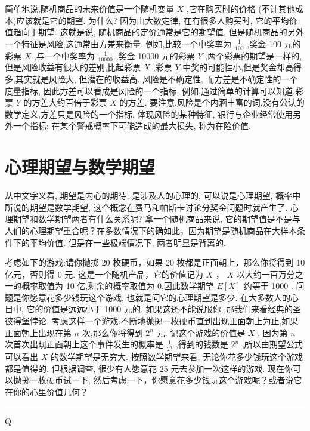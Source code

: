 \documentclass[10pt]{article}
\newcommand{\HRule}{\begin{center}\rule{0.9\linewidth}{0.2mm}\end{center}}
\begin{document}
简单地说,随机商品的未来价值是一个随机变量 \(X\) ,它在购买时的价格 (不计其他成本)应该就是它的期望. 为什么? 因为由大数定律, 在有很多人购买时, 它的平均价值趋向于期望. 这就是说, 随机商品的定价通常是它的期望值. 但是随机商品的另外一个特征是风险,这通常由方差来衡量. 例如,比较一个中奖率为 \(\frac{1}{100}\) ,奖金 100 元的彩票 \(X\) ,与一个中奖率为 \(\frac{1}{10000}\) ,奖金 10000 元的彩票 \(Y\) ,两个彩票的期望是一样的,但是风险收益有很大的差别,比起彩票 \(X\) ,彩票 \(Y\) 中奖的可能性小,但是奖金却高得多,其实就是风险大, 但潜在的收益高. 风险是不确定性, 而方差是不确定性的一个度量指标, 因此方差可以看成是风险的一个指标. 例如,通过简单的计算可以知道,彩票 \(Y\) 的方差大约百倍于彩票 \(X\) 的方差. 要注意,风险是个内涵丰富的词,没有公认的数学定义,方差只是风险的一个指标, 体现风险的某种特征, 银行与企业经常使用另外一个指标: 在某个警戒概率下可能造成的最大损失, 称为在险价值.



\section*{心理期望与数学期望}

从中文字义看, 期望是内心的期待, 是涉及人的心理的, 可以说是心理期望, 概率中所说的期望是数学期望, 这个概念在费马和帕斯卡讨论分奖金问题时就产生了. 心理期望和数学期望两者有什么关系呢? 拿一个随机商品来说, 它的期望值是不是与人们的心理期望重合呢？在多数情况下的确如此，因为期望是随机商品在大样本条件下的平均价值. 但是在一些极端情况下, 两者明显是背离的.

考虑如下的游戏:请你抛掷 20 枚硬币，如果 20 枚都是正面朝上，那么你将得到 10 亿元，否则得 0 元. 这是一个随机产品，它的价值记为 \(X\) ， \(X\) 以大约一百万分之一的概率取值为 10 亿,剩余的概率取值为 0,因此数学期望 \(E\left\lbrack  X\right\rbrack\) 约等于 1000 . 问题是你愿意花多少钱玩这个游戏, 也就是问它的心理期望是多少. 在大多数人的心目中, 它的价值是远远小于 1000 元的. 如果这还不能说服你, 那我们来看经典的圣彼得堡悖论. 考虑这样一个游戏:不断地抛掷一枚硬币直到出现正面朝上为止,如果正面朝上出现在第 \(n\) 次,那么你将得到 \({2}^{n}\) 元. 记这个游戏的价值是 \(X\) . 因为第 \(n\) 次首次出现正面朝上这个事件发生的概率是 \(\frac{1}{{2}^{n}}\) ,得到的钱数是 \({2}^{n}\) ,所以由期望公式可以看出 \(X\) 的数学期望是无穷大. 按照数学期望来看, 无论你花多少钱玩这个游戏都是值得的. 但根据调查, 很少有人愿意花 25 元去参加一次这样的游戏. 现在你可以抛掷一枚硬币试一下, 然后考虑一下，你愿意花多少钱玩这个游戏呢？或者说它在你的心里价值几何？

\HRule

Q
\end{document}
